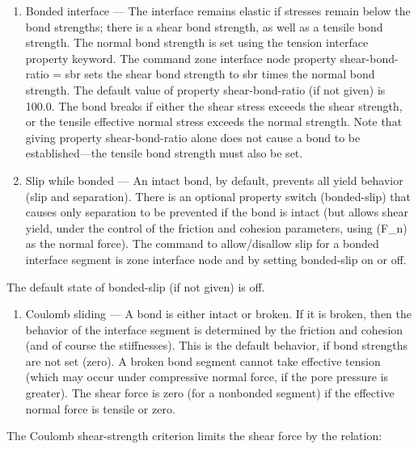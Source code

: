 \documentclass[a4paper, nobind]{templates/ociamthesis}
\providecommand{\tightlist}{%
  \setlength{\itemsep}{0pt}\setlength{\parskip}{0pt}}
\begin{document}
\begin{enumerate}
\def\labelenumi{\arabic{enumi}.}
\item
  Bonded interface --- The interface remains elastic if stresses
  remain below the bond strengths; there is a shear bond strength, as
  well as a tensile bond strength. The normal bond strength is set
  using the tension interface property keyword. The command zone
  interface node property shear-bond-ratio = sbr sets the shear bond
  strength to sbr times the normal bond strength. The default value of
  property shear-bond-ratio (if not given) is 100.0. The bond breaks
  if either the shear stress exceeds the shear strength, or the
  tensile effective normal stress exceeds the normal strength. Note
  that giving property shear-bond-ratio alone does not cause a bond to
  be established---the tensile bond strength must also be set.\\
\item
  Slip while bonded --- An intact bond, by default, prevents all yield
  behavior (slip and separation). There is an optional property switch
  (bonded-slip) that causes only separation to be prevented if the
  bond is intact (but allows shear yield, under the control of the
  friction and cohesion parameters, using (F\_n) as the normal force).
  The command to allow/disallow slip for a bonded interface segment is
  zone interface node and by setting bonded-slip on or off.\\
\end{enumerate}

The default state of bonded-slip (if not given) is off.

\begin{enumerate}
\def\labelenumi{\arabic{enumi}.}
\setcounter{enumi}{2}
\tightlist
\item
  Coulomb sliding --- A bond is either intact or broken. If it is
  broken, then the behavior of the interface segment is determined by
  the friction and cohesion (and of course the stiffnesses). This is
  the default behavior, if bond strengths are not set (zero). A broken
  bond segment cannot take effective tension (which may occur under
  compressive normal force, if the pore pressure is greater). The
  shear force is zero (for a nonbonded segment) if the effective
  normal force is tensile or zero.\\
\end{enumerate}

The Coulomb shear-strength criterion limits the shear force by the
relation:
\end{document}
